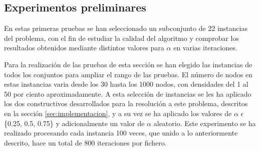 \subsection{Experimentos preliminares}
En estas primeras pruebas se han seleccionado un subconjunto de 22 instancias del problema, con el fin de estudiar la calidad del algoritmo y comprobar los resultados obtenidos mediante distintos valores para $\alpha$ en varias iteraciones.

Para la realización de las pruebas de esta sección se han elegido las instancias de todos los conjuntos para ampliar el rango de las pruebas. El número de nodos en estas instancias varia desde los 30 hasta los 1000 nodos, con densidades del 1 al 50 por ciento aproximadamente.
A esta selección de instancias se les ha aplicado los dos constructivos desarrollados para la resolución a este problema, descritos en la sección \ref{sec:implementacion}, y a su vez se ha aplicado los valores de $\alpha$ $\epsilon$ \{0.25, 0.5, 0.75\} y adicionalmente un valor de $\alpha$ aleatorio.
Este experimento se ha realizado procesando cada instancia 100 veces, que unido a lo anteriormente descrito, hace un total de 800 iteraciones por fichero.

